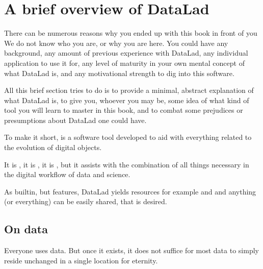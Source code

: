 \chapter{A brief overview of DataLad}
\label{\detokenize{intro/philosophy:a-brief-overview-of-datalad}}\label{\detokenize{intro/philosophy:philo}}\label{\detokenize{intro/philosophy::doc}}

\sphinxAtStartPar
There can be numerous reasons why you ended up with this book in front of
you \textendash{} We do not know who you are, or why you are here.
You could have any background, any amount of previous experience with
DataLad, any individual application to use it for,
any level of maturity in your own mental concept of what DataLad
is, and any motivational strength to dig into this software.

\sphinxAtStartPar
All this brief section tries to do is to provide a minimal, abstract explanation
of what DataLad is, to give you, whoever you may be, some idea of what kind of
tool you will learn to master in this book, and to combat some prejudices
or presumptions about DataLad one could have.

\sphinxAtStartPar
To make it short,  is a software tool developed to aid with everything
related to the evolution of digital objects.

\sphinxAtStartPar
It is , it is
, it is
,
but it assists with the combination of all things
necessary in the digital workflow of data and science.

\sphinxAtStartPar
As built\sphinxhyphen{}in, but  features, DataLad yields  resources \textendash{} for example
{\hyperref[\detokenize{glossary:term-metadata}]{}} and {\hyperref[\detokenize{glossary:term-provenance}]{}} \textemdash{} and anything (or everything)
can be easily shared,  that is desired.


\section{On data}
\label{\detokenize{intro/philosophy:on-data}}
\sphinxAtStartPar
Everyone uses data. But once it exists, it does not suffice for most data
to simply reside unchanged in a single location for eternity.

